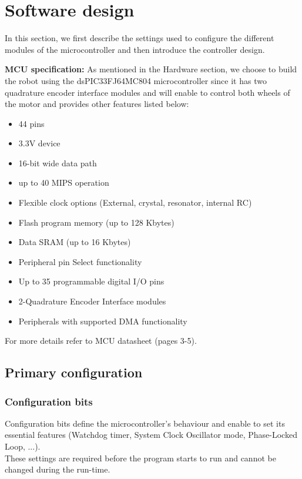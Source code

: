 \section{Software design} \label{chap:software}
In this section, we first describe the settings used to configure the different modules of the microcontroller and then introduce the controller design.

\vskip 0.2in
\noindent
\textbf{MCU specification:}
\vskip 0.1in
\noindent
As mentioned in the Hardware section, we choose to build the robot using the dsPIC33FJ64MC804 microcontroller since it has two quadrature encoder interface modules and will enable to control both wheels of the motor and provides other features listed below:
\begin{itemize}
    \item 44 pins
    \item 3.3V device
    \item 16-bit wide data path
    \item up to 40 MIPS operation
    \item Flexible clock options (External, crystal, resonator, internal RC)
    \item Flash program memory (up to 128 Kbytes)
    \item Data SRAM (up to 16 Kbytes)
    \item Peripheral pin Select functionality
    \item Up to 35 programmable digital I/O pins
    \item 2-Quadrature Encoder Interface modules
    \item Peripherals with supported DMA functionality
\end{itemize}
For more details refer to MCU datasheet \cite{mcu}(pages 3-5).

\subsection{Primary configuration}

\subsubsection*{Configuration bits}

Configuration bits define the microcontroller’s behaviour and enable to set its essential features (Watchdog timer, System Clock Oscillator mode, Phase-Locked Loop, ...).\\
These settings are required before the program starts to run and cannot be changed during the run-time.\\
\vskip 0.1in
\noindent

